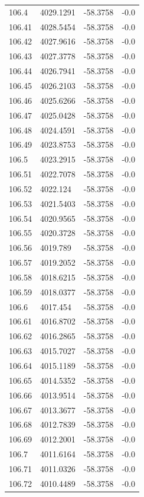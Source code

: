\begin{table}[H]
\begin{tabular}{llll}
106.4 & 4029.1291 & -58.3758 & -0.0 \\
106.41 & 4028.5454 & -58.3758 & -0.0 \\
106.42 & 4027.9616 & -58.3758 & -0.0 \\
106.43 & 4027.3778 & -58.3758 & -0.0 \\
106.44 & 4026.7941 & -58.3758 & -0.0 \\
106.45 & 4026.2103 & -58.3758 & -0.0 \\
106.46 & 4025.6266 & -58.3758 & -0.0 \\
106.47 & 4025.0428 & -58.3758 & -0.0 \\
106.48 & 4024.4591 & -58.3758 & -0.0 \\
106.49 & 4023.8753 & -58.3758 & -0.0 \\
106.5 & 4023.2915 & -58.3758 & -0.0 \\
106.51 & 4022.7078 & -58.3758 & -0.0 \\
106.52 & 4022.124 & -58.3758 & -0.0 \\
106.53 & 4021.5403 & -58.3758 & -0.0 \\
106.54 & 4020.9565 & -58.3758 & -0.0 \\
106.55 & 4020.3728 & -58.3758 & -0.0 \\
106.56 & 4019.789 & -58.3758 & -0.0 \\
106.57 & 4019.2052 & -58.3758 & -0.0 \\
106.58 & 4018.6215 & -58.3758 & -0.0 \\
106.59 & 4018.0377 & -58.3758 & -0.0 \\
106.6 & 4017.454 & -58.3758 & -0.0 \\
106.61 & 4016.8702 & -58.3758 & -0.0 \\
106.62 & 4016.2865 & -58.3758 & -0.0 \\
106.63 & 4015.7027 & -58.3758 & -0.0 \\
106.64 & 4015.1189 & -58.3758 & -0.0 \\
106.65 & 4014.5352 & -58.3758 & -0.0 \\
106.66 & 4013.9514 & -58.3758 & -0.0 \\
106.67 & 4013.3677 & -58.3758 & -0.0 \\
106.68 & 4012.7839 & -58.3758 & -0.0 \\
106.69 & 4012.2001 & -58.3758 & -0.0 \\
106.7 & 4011.6164 & -58.3758 & -0.0 \\
106.71 & 4011.0326 & -58.3758 & -0.0 \\
106.72 & 4010.4489 & -58.3758 & -0.0 \\

\end{tabular}
\end{table}
